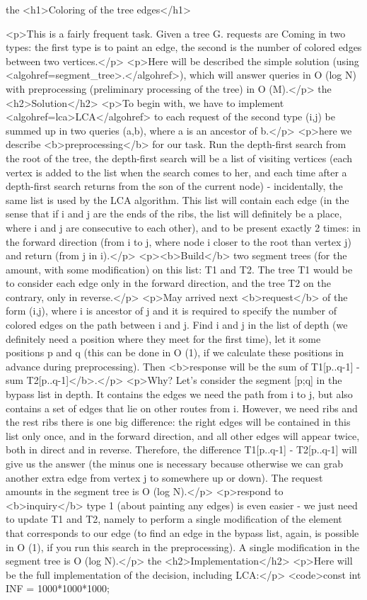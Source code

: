 the <h1>Coloring of the tree edges</h1>

<p>This is a fairly frequent task. Given a tree G. requests are Coming in two types: the first type is to paint an edge, the second is the number of colored edges between two vertices.</p>
<p>Here will be described the simple solution (using <algohref=segment_tree>.</algohref>), which will answer queries in O (log N) with preprocessing (preliminary processing of the tree) in O (M).</p>
the <h2>Solution</h2>
<p>To begin with, we have to implement <algohref=lca>LCA</algohref> to each request of the second type (i,j) be summed up in two queries (a,b), where a is an ancestor of b.</p>
<p>here we describe <b>preprocessing</b> for our task. Run the depth-first search from the root of the tree, the depth-first search will be a list of visiting vertices (each vertex is added to the list when the search comes to her, and each time after a depth-first search returns from the son of the current node) - incidentally, the same list is used by the LCA algorithm. This list will contain each edge (in the sense that if i and j are the ends of the ribs, the list will definitely be a place, where i and j are consecutive to each other), and to be present exactly 2 times: in the forward direction (from i to j, where node i closer to the root than vertex j) and return (from j in i).</p>
<p><b>Build</b> two segment trees (for the amount, with some modification) on this list: T1 and T2. The tree T1 would be to consider each edge only in the forward direction, and the tree T2 on the contrary, only in reverse.</p>
<p>May arrived next <b>request</b> of the form (i,j), where i is ancestor of j and it is required to specify the number of colored edges on the path between i and j. Find i and j in the list of depth (we definitely need a position where they meet for the first time), let it some positions p and q (this can be done in O (1), if we calculate these positions in advance during preprocessing). Then <b>response will be the sum of T1[p..q-1] - sum T2[p..q-1]</b>.</p>
<p>Why? Let's consider the segment [p;q] in the bypass list in depth. It contains the edges we need the path from i to j, but also contains a set of edges that lie on other routes from i. However, we need ribs and the rest ribs there is one big difference: the right edges will be contained in this list only once, and in the forward direction, and all other edges will appear twice, both in direct and in reverse. Therefore, the difference T1[p..q-1] - T2[p..q-1] will give us the answer (the minus one is necessary because otherwise we can grab another extra edge from vertex j to somewhere up or down). The request amounts in the segment tree is O (log N).</p>
<p>respond to <b>inquiry</b> type 1 (about painting any edges) is even easier - we just need to update T1 and T2, namely to perform a single modification of the element that corresponds to our edge (to find an edge in the bypass list, again, is possible in O (1), if you run this search in the preprocessing). A single modification in the segment tree is O (log N).</p>
the <h2>Implementation</h2>
<p>Here will be the full implementation of the decision, including LCA:</p>
<code>const int INF = 1000*1000*1000;

